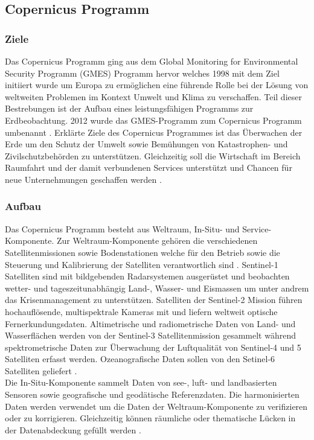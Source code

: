 \subsection{Copernicus Programm}
\subsubsection{Ziele}
Das Copernicus Programm ging aus dem Global Monitoring for Environmental Security Programm (GMES) Programm hervor welches 1998 mit dem Ziel initiiert wurde um Europa 
zu ermöglichen eine führende Rolle bei der Lösung von weltweiten Problemen im Kontext Umwelt und Klima zu verschaffen. Teil dieser Bestrebungen ist der Aufbau eines 
leistungsfähigen Programms zur Erdbeobachtung. 2012 wurde das GMES-Programm zum Copernicus Programm umbenannt \cite{history_of_copernicus}.
Erklärte Ziele des Copernicus Programmes ist das Überwachen der Erde um den Schutz der Umwelt sowie Bemühungen von Katastrophen- und Zivilschutzbehörden zu 
unterstützen. Gleichzeitig soll die Wirtschaft im Bereich Raumfahrt und der damit verbundenen Services unterstützt und Chancen für neue Unternehmungen geschaffen
werden \cite{copernicus_regulation}.

\subsubsection{Aufbau}
Das Copernicus Programm besteht aus Weltraum, In-Situ- und Service-Komponente. 
Zur Weltraum-Komponente gehören die verschiedenen Satellitenmissionen sowie Bodenstationen welche für den Betrieb sowie die Steuerung und Kalibrierung  der 
Satelliten verantwortlich sind \cite{copernicus_regulation}. Sentinel-1 Satelliten sind mit bildgebenden Radarsystemen ausgerüstet und beobachten wetter- und 
tageszeitunabhängig Land-, Wasser- und Eismassen um unter andrem das Krisenmanagement zu unterstützen. Satelliten der Sentinel-2 Mission führen hochauflösende, 
multispektrale Kameras mit und liefern weltweit optische Fernerkundungsdaten. Altimetrische und radiometrische Daten von Land- und Wasserflächen werden von der 
Sentinel-3 Satellitenmission gesammelt während spektrometrische Daten zur Überwachung der Luftqualität von Sentinel-4 und 5 Satelliten erfasst werden. 
Ozeanografische Daten sollen von den Setinel-6 Satelliten geliefert \cite{sentinel_overview}. \\

Die In-Situ-Komponente sammelt Daten von see-, luft- und landbasierten Sensoren sowie geografische und geodätische Referenzdaten. Die harmonisierten Daten 
werden verwendet um die Daten der Weltraum-Komponente zu verifizieren oder zu korrigieren. Gleichzeitig können räumliche oder thematische Lücken in der 
Datenabdeckung gefüllt werden \cite{copernicus_regulation}\cite{what_is_copernicus}. \\

